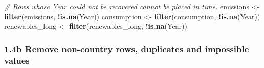 \documentclass[
]{article}
\newenvironment{Shaded}{\begin{snugshade}}{\end{snugshade}}
\newcommand{\CommentTok}[1]{\textcolor[rgb]{0.56,0.35,0.01}{\textit{#1}}}
\newcommand{\FunctionTok}[1]{\textcolor[rgb]{0.13,0.29,0.53}{\textbf{#1}}}
\newcommand{\NormalTok}[1]{#1}
\newcommand{\OtherTok}[1]{\textcolor[rgb]{0.56,0.35,0.01}{#1}}
\newcommand{\SpecialCharTok}[1]{\textcolor[rgb]{0.81,0.36,0.00}{\textbf{#1}}}
\begin{document}
\begin{Shaded}
\begin{Highlighting}[]
\CommentTok{\# Rows whose Year could not be recovered cannot be placed in time.}
\NormalTok{emissions }\OtherTok{\textless{}{-}} \FunctionTok{filter}\NormalTok{(emissions, }\SpecialCharTok{!}\FunctionTok{is.na}\NormalTok{(Year))}
\NormalTok{consumption }\OtherTok{\textless{}{-}} \FunctionTok{filter}\NormalTok{(consumption, }\SpecialCharTok{!}\FunctionTok{is.na}\NormalTok{(Year))}
\NormalTok{renewables\_long }\OtherTok{\textless{}{-}} \FunctionTok{filter}\NormalTok{(renewables\_long, }\SpecialCharTok{!}\FunctionTok{is.na}\NormalTok{(Year))}
\end{Highlighting}
\end{Shaded}

\subsubsection{1.4b Remove non-country rows, duplicates and impossible
values}\label{b-remove-non-country-rows-duplicates-and-impossible-values}
\end{document}
